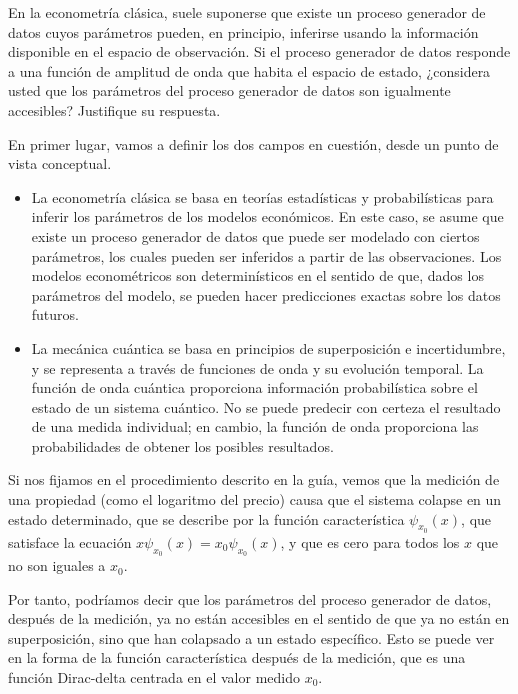 \begin{problema}
    En la econometría clásica, suele suponerse que existe un proceso generador de datos cuyos parámetros pueden, en principio, inferirse usando la información disponible en el espacio de observación. Si el proceso generador de datos responde a una función de amplitud de onda que habita el espacio de estado, ¿considera usted que los parámetros del proceso generador de datos son igualmente accesibles? Justifique su respuesta.
    \begin{sol}
        En primer lugar, vamos a definir los dos campos en cuestión, desde un punto de vista conceptual. 
        \begin{itemize}
            \item La econometría clásica se basa en teorías estadísticas y probabilísticas para inferir los parámetros de los modelos económicos. En este caso, se asume que existe un proceso generador de datos que puede ser modelado con ciertos parámetros, los cuales pueden ser inferidos a partir de las observaciones. Los modelos econométricos son determinísticos en el sentido de que, dados los parámetros del modelo, se pueden hacer predicciones exactas sobre los datos futuros.
            \item La mecánica cuántica se basa en principios de superposición e incertidumbre, y se representa a través de funciones de onda y su evolución temporal. La función de onda cuántica proporciona información probabilística sobre el estado de un sistema cuántico. No se puede predecir con certeza el resultado de una medida individual; en cambio, la función de onda proporciona las probabilidades de obtener los posibles resultados.
        \end{itemize}

        Si nos fijamos en el procedimiento descrito en la guía, vemos que la medición de una propiedad (como el logaritmo del precio) causa que el sistema colapse en un estado determinado, que se describe por la función característica $\psi_{x_{0}}(x)$, que satisface la ecuación $x\psi_{x_{0}}(x) = x_{0}\psi_{x_{0}}(x)$, y que es cero para todos los $x$ que no son iguales a $x_{0}$.\bigbreak

        Por tanto, podríamos decir que los parámetros del proceso generador de datos, después de la medición, ya no están accesibles en el sentido de que ya no están en superposición, sino que han colapsado a un estado específico. Esto se puede ver en la forma de la función característica después de la medición, que es una función Dirac-delta centrada en el valor medido $x_{0}$.\bigbreak 


\end{sol}
\end{problema}
